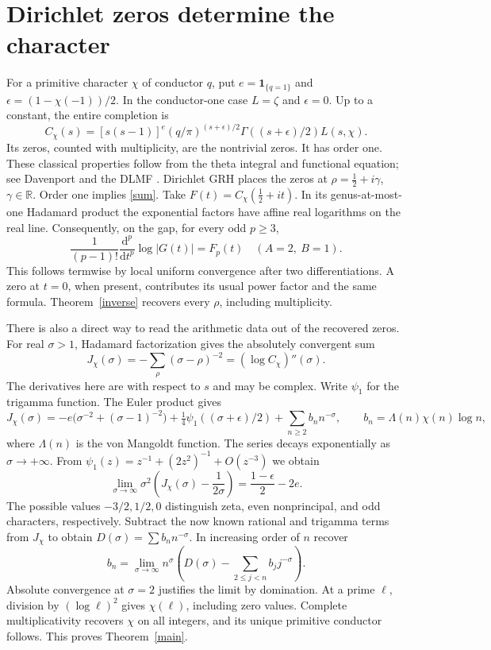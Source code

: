 \documentclass[11pt,letterpaper]{article}
\newcommand{\R}{\mathbb R}
\newcommand{\dd}{\mathrm d}
\numberwithin{equation}{section}
\begin{document}
\section{Dirichlet zeros determine the character}
For a primitive character $\chi$ of conductor $q$, put
$e=\mathbf 1_{\{q=1\}}$ and $\epsilon=(1-\chi(-1))/2$. In the conductor-one
case $L=\zeta$ and $\epsilon=0$. Up to a constant, the entire completion is
\[
 C_\chi(s)=[s(s-1)]^e(q/\pi)^{(s+\epsilon)/2}
            \Gamma((s+\epsilon)/2)L(s,\chi).
\]
Its zeros, counted with multiplicity, are the nontrivial zeros. It has
order one. These classical properties follow from the theta integral and
functional equation; see Davenport \cite{davenport} and the DLMF
\cite{dlmf}. Dirichlet GRH places the zeros at
$\rho=\tfrac12+i\gamma$, $\gamma\in\R$. Order one implies
\eqref{sum}. Take $F(t)=C_\chi(\tfrac12+it)$. In its genus-at-most-one
Hadamard product the exponential factors have affine real logarithms on
the real line. Consequently, on the gap, for every odd $p\ge3$,
\[
 \frac{1}{(p-1)!}\frac{\dd^p}{\dd t^p}\log|G(t)|=F_p(t)
       \quad (A=2,\ B=1).
\]
This follows termwise by local uniform convergence after two
differentiations. A zero at $t=0$, when present, contributes its usual
power factor and the same formula. Theorem~\ref{inverse} recovers every
$\rho$, including multiplicity.

There is also a direct way to read the arithmetic data out of the recovered
zeros. For real $\sigma>1$, Hadamard factorization gives the absolutely
convergent sum
\[
 J_\chi(\sigma)=-\sum_\rho(\sigma-\rho)^{-2}
            =(\log C_\chi)''(\sigma).
\]
The derivatives here are with respect to $s$ and may be complex. Write
$\psi_1$ for the trigamma function. The Euler product gives
\[
 J_\chi(\sigma)=-e\big(\sigma^{-2}+(\sigma-1)^{-2}\big)
   +\tfrac14\psi_1((\sigma+\epsilon)/2)
   +\sum_{n\ge2} b_n n^{-\sigma},
 \qquad b_n=\Lambda(n)\chi(n)\log n ,
\]
where $\Lambda(n)$ is the von Mangoldt function. The series decays
exponentially as $\sigma\to+\infty$. From
$\psi_1(z)=z^{-1}+(2z^2)^{-1}+O(z^{-3})$ we obtain
\[
 \lim_{\sigma\to\infty}\sigma^2\left(J_\chi(\sigma)-\frac1{2\sigma}\right)
        =\frac{1-\epsilon}{2}-2e .
\]
The possible values $-3/2,1/2,0$ distinguish zeta, even nonprincipal,
and odd characters, respectively. Subtract the now known rational and
trigamma terms from $J_\chi$ to obtain $D(\sigma)=\sum b_n n^{-\sigma}$.
In increasing order of $n$ recover
\[
 b_n=\lim_{\sigma\to\infty} n^\sigma
       \left(D(\sigma)-\sum_{2\le j<n} b_j j^{-\sigma}\right).
\]
Absolute convergence at $\sigma=2$ justifies the limit by domination.
At a prime $\ell$, division by $(\log\ell)^2$ gives $\chi(\ell)$,
including zero values. Complete multiplicativity recovers $\chi$ on all
integers, and its unique primitive conductor follows. This proves
Theorem~\ref{main}.
\newpage
\end{document}
